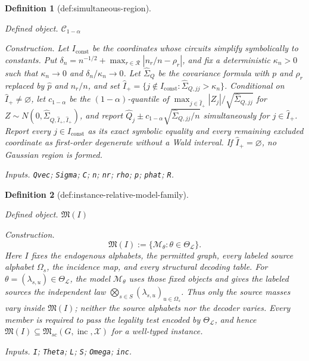 \documentclass{article}
\newtheorem{definition}{Definition}
\begin{document}
\begin{definition}[def:simultaneous-region]\label{def:simultaneous-region}
\par\smallskip\noindent\emph{Defined object.} \(\mathcal C_{1-\alpha}\)
\par\smallskip\noindent\emph{Construction.} Let \(I_{\mathrm{const}}\) be the coordinates whose circuits simplify symbolically to constants.  Put \(\delta_n=n^{-1/2}+\max_{r\in\mathcal R}|n_r/n-\rho_r|\), and fix a deterministic \(\kappa_n>0\) such that \(\kappa_n\to0\) and \(\delta_n/\kappa_n\to0\).  Let \(\widehat\Sigma_Q\) be the covariance formula with \(p\) and \(\rho_r\) replaced by \(\widehat p\) and \(n_r/n\), and set \(\widehat I_+=\{j\notin I_{\mathrm{const}}:\widehat\Sigma_{Q,jj}>\kappa_n\}\).  Conditional on \(\widehat I_+\ne\varnothing\), let \(c_{1-\alpha}\) be the \((1-\alpha)\)-quantile of \(\max_{j\in\widehat I_+}|Z_j|/\sqrt{\widehat\Sigma_{Q,jj}}\) for \(Z\sim N(0,\widehat\Sigma_{Q,\widehat I_+,\widehat I_+})\), and report \(\widehat Q_j\pm c_{1-\alpha}\sqrt{\widehat\Sigma_{Q,jj}/n}\) simultaneously for \(j\in\widehat I_+\).  Report every \(j\in I_{\mathrm{const}}\) as its exact symbolic equality and every remaining excluded coordinate as first-order degenerate without a Wald interval.  If \(\widehat I_+=\varnothing\), no Gaussian region is formed.
\par\smallskip\noindent\emph{Inputs.} \texttt{Qvec}; \texttt{Sigma}; \texttt{C}; \texttt{n}; \texttt{nr}; \texttt{rho}; \texttt{p}; \texttt{phat}; \texttt{R}.
\end{definition}

\begin{definition}[def:instance-relative-model-family]\label{def:instance-relative-model-family}
\par\smallskip\noindent\emph{Defined object.} \(\mathfrak M(I)\)
\par\smallskip\noindent\emph{Construction.} \[
 \mathfrak M(I):=\{\mathcal M_\theta:\theta\in\Theta_{\mathcal L}\}.
\]
Here \(I\) fixes the endogenous alphabets, the permitted graph, every labeled source alphabet \(\Omega_s\), the incidence map, and every structural decoding table.  For \(\theta=(\lambda_{s,u})\in\Theta_{\mathcal L}\), the model \(\mathcal M_\theta\) uses those fixed objects and gives the labeled sources the independent law \(\bigotimes_{s\in S}(\lambda_{s,u})_{u\in\Omega_s}\).  Thus only the source masses vary inside \(\mathfrak M(I)\); neither the source alphabets nor the decoder varies.  Every member is required to pass the legality test encoded by \(\Theta_{\mathcal L}\), and hence \(\mathfrak M(I)\subseteq\mathfrak M_{sc}(G,\operatorname{inc},\mathcal X)\) for a well-typed instance.
\par\smallskip\noindent\emph{Inputs.} \texttt{I}; \texttt{Theta}; \texttt{L}; \texttt{S}; \texttt{Omega}; \texttt{inc}.
\end{definition}
\end{document}
